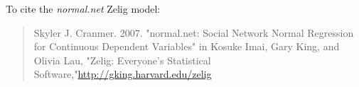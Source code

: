 To cite the \emph{ normal.net } Zelig model:
 \begin{verse}
 Skyler J. Cranmer. 2007. "normal.net: Social Network Normal Regression for Continuous Dependent Variables" in Kosuke Imai, Gary King, and Olivia Lau, "Zelig: Everyone's Statistical Software,"\url{http://gking.harvard.edu/zelig} 
\end{verse}